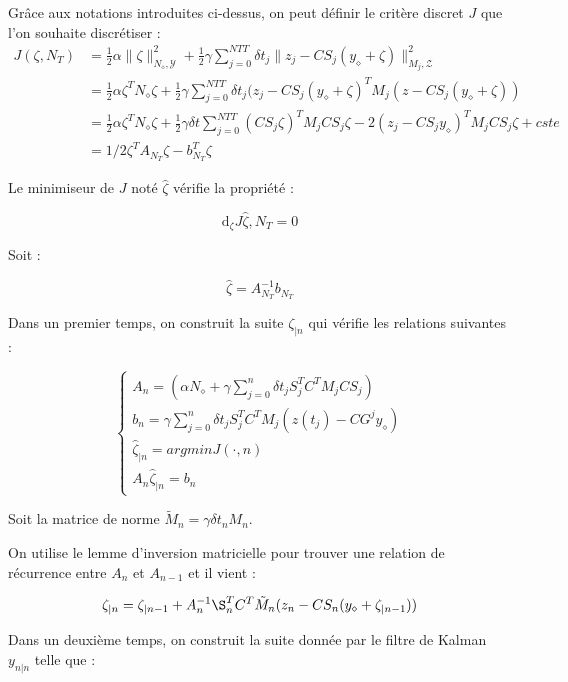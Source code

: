 \documentclass[a4paper]{article}
\begin{document}
Grâce aux notations introduites ci-dessus, on peut définir le critère discret $J$ que l'on souhaite discrétiser :
\[
\begin{split}
    J(\zeta,N_T) &= \frac{1}{2}\alpha \parallel \zeta \parallel _{N_{\diamond},\mathscr{Y}}^2 + \frac{1}{2}\gamma \sum_{j=0}^{NTT} \delta t_j \parallel z_j - CS_j(y_{\diamond}+\zeta) \parallel_{M_j,\mathscr{Z}}^2 \\
	                 &= \frac{1}{2}\alpha \zeta ^T N_{\diamond} \zeta + \frac{1}{2}\gamma \sum_{j=0}^{NTT} \delta t_j (z_j - CS_j(y_{\diamond}+\zeta)^T M_j (z - CS_j(y_{\diamond}+\zeta))\\
					 &=  \frac{1}{2}\alpha \zeta ^T N_{\diamond} \zeta + \frac{1}{2}\gamma \delta t \sum_{j=0}^{NTT} (C S_j\zeta)^T M_jCS_j\zeta
			            -2(z_j-CS_jy_{\diamond})^TM_jCS_j \zeta + cste\\
					 &= 1/2 \zeta^T A_{N_T} \zeta - b_{N_T}^T\zeta
\end{split}
\]

Le minimiseur de $J$ noté $\hat{\zeta}$ vérifie la propriété :

\[
\mathrm{d}_{\zeta} J{\hat{\zeta},N_T} = 0
\]

Soit :

\[ \hat{\zeta}= A_{N_T}^{-1} b_{N_T} \]

Dans un premier temps, on construit la suite $\zeta_{|n}$ qui vérifie les relations suivantes :

\begin{equation}
	\begin{cases}
		\displaystyle A_n = (\alpha N_{\diamond} + \gamma  \sum_{j=0}^{n}\delta t_j S_j^TC^TM_jCS_j)\\
		b_n = \gamma \sum_{j=0}^{n} \delta t_j  S_j^T C^T M_j(z(t_j)-CG^jy_{\diamond}) \\
		\hat{\zeta}_{|n} = argmin J(\cdot,n) \\
		A_n \hat{\zeta}_{|n} = b_n
	\end{cases}
\end{equation}


Soit la matrice de norme $\tilde{M}_n= \gamma \delta t_n M_n$.


On utilise le lemme d'inversion matricielle pour trouver une relation de récurrence entre $A_n$ et $A_{n-1}$ et il vient :

\[\zeta_{|n} = \zeta_{|n-1} + A_{n}^{-1} \S_n^T C^T \tilde{M}_n (z_n- C S_n (y_{\diamond} + \zeta_{|n-1}) ) \]

Dans un deuxième temps, on construit la suite donnée par le filtre de Kalman $y_{n|n}$ telle que :
\end{document}
